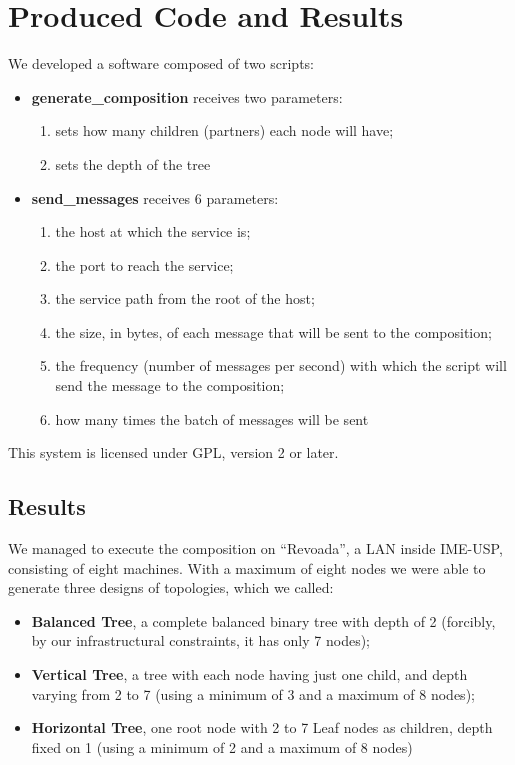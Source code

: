 \section{Produced Code and Results}

We developed a software composed of two scripts:
\begin{itemize}
	\item \textbf{generate\_composition} receives two parameters:
	\begin{enumerate}
		\item sets how many children (partners) each node will have;
		\item sets the depth of the tree
	\end{enumerate}
	\item \textbf{send\_messages} receives 6 parameters:
	\begin{enumerate}
		\item the host at which the service is;
		\item the port to reach the service;
		\item the service path from the root of the host;
		\item the size, in bytes, of each message that will be sent to the composition;
		\item the frequency (number of messages per second) with which the script will send the message to the composition;
		\item how many times the batch of messages will be sent
	\end{enumerate}
\end{itemize}

This system is licensed under GPL, version 2 or later.

\subsection{Results}
We managed to execute the composition on ``Revoada'', a LAN inside IME-USP, consisting of eight machines. With a maximum of eight nodes we were able to generate three designs of topologies, which we called:

\begin{itemize}
	\item \textbf{Balanced Tree}, a complete balanced binary tree with depth of 2 (forcibly, by our infrastructural constraints, it has only 7 nodes);
	\item \textbf{Vertical Tree}, a tree with each node having just one child, and depth varying from 2 to 7 (using a minimum of 3 and a maximum of 8 nodes);
	\item \textbf{Horizontal Tree}, one root node with 2 to 7 Leaf nodes as children, depth fixed on 1 (using a minimum of 2 and a maximum of 8 nodes)
\end{itemize}

